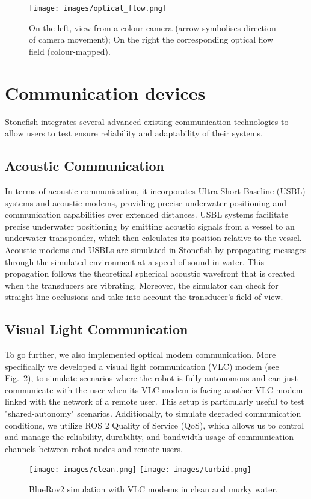 \begin{figure}[t]
	\centering
    \texttt{[image: images/optical\_flow.png]}

    \caption{On the left, view from a colour camera (arrow symbolises direction of camera movement); On the right the corresponding optical flow field (colour-mapped).} 
\label{fig:oflow}
\end{figure}

\section{Communication devices}
Stonefish integrates several advanced existing communication technologies to allow users to test ensure reliability and adaptability of their systems.

\subsection{Acoustic Communication}
In terms of acoustic communication, it incorporates Ultra-Short Baseline (USBL) systems and acoustic modems, providing precise underwater positioning and communication capabilities over extended distances.
USBL systems facilitate precise underwater positioning by emitting acoustic signals from a vessel to an underwater transponder, which then calculates its position relative to the vessel. Acoustic modems and USBLs are simulated in Stonefish by propagating messages through the simulated environment at a speed of sound in water. This propagation follows the theoretical spherical acoustic wavefront that is created when the transducers are vibrating. Moreover, the simulator can check for straight line occlusions and take into account the transducer's field of view.


\subsection{Visual Light Communication}
To go further, we also implemented optical modem communication. More specifically we developed a visual light communication (VLC) modem (see Fig.~\ref{fig:vlc}), to simulate scenarios where the robot is fully autonomous and can just communicate with the user when its VLC modem is facing another VLC modem linked with the network of a remote user. This setup is particularly useful to test "shared-autonomy" scenarios. Additionally, to simulate degraded communication conditions, we utilize ROS 2 Quality of Service (QoS), which allows us to control and manage the reliability, durability, and bandwidth usage of communication channels between robot nodes and remote users.
\begin{figure}[t]
    \centering
    \texttt{[image: images/clean.png]}
    \texttt{[image: images/turbid.png]}
    \caption{BlueRov2 simulation with VLC modems in clean and murky water.}
\label{fig:vlc}
\end{figure}

